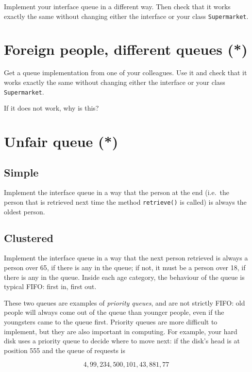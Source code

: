 \documentclass{article}
\begin{document}
Implement your interface queue in a different way. Then check that it
works exactly the same without changing either the interface or your
class \verb+Supermarket+. 

\section{Foreign people, different queues (*)}
\label{sec:fore-people-diff}

Get a queue implementation from one of your colleagues. Use it and
check that it works exactly the same without changing either the
interface or your class \verb+Supermarket+. 

If it does not work, why is this?

\section{Unfair queue (*)}
\label{sec:unfair-queue-}

\subsection{Simple}
\label{sec:simple}

Implement the interface queue in a way that the person at the end
(i.e.~the person that is retrieved next time the method
\verb+retrieve()+ is called) is always the oldest person. 

\subsection{Clustered}
\label{sec:clustered}

Implement the interface queue in a way that the next person retrieved
is always a person over 65, if there is any in the queue; if not, it
must be a person over 18, if there is any in the queue. Inside each
age category, the behaviour of the queue is typical FIFO: first in,
first out. 

These two queues are examples of \emph{priority queues}, and are not
strictly FIFO: old people will always come out of the queue than
younger people, even if the youngsters came to the queue
first. Priority queues are more difficult to implement, but they are
also important in computing. For example, your hard disk uses a
priority queue to decide where to move next: if the disk's head is at
position 555 and the queue of requests is

$$4, 99, 234, 500, 101, 43, 881, 77$$
\end{document}
